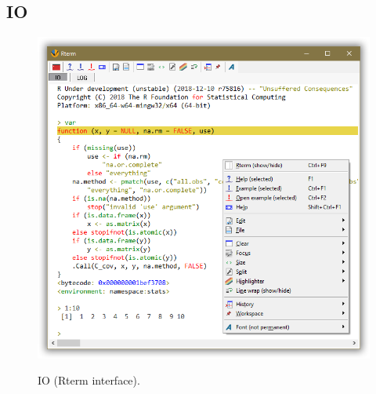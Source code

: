 \hypertarget{working_rterm_io}{}
\subsection{IO}

\begin{figure}[H]
  \includegraphics[scale=0.35]{./res/rterm_io.png}\\
  \caption{IO (Rterm interface).}
  \label{fig:rterm_io}
\end{figure}

